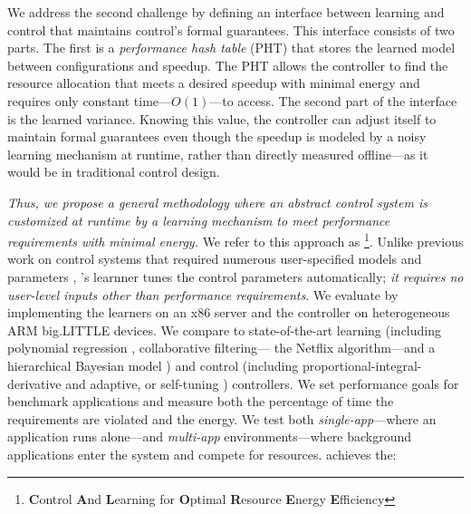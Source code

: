 We address the second challenge by defining an interface between
learning and control that maintains control's formal guarantees.  This
interface consists of two parts.  The first is a \emph{performance
  hash table} (PHT) that stores the learned model between
configurations and speedup.  The PHT allows the controller to find the
resource allocation that meets a desired speedup with minimal energy
and requires only constant time---$O(1)$---to access.  The second part
of the interface is the learned variance.  Knowing this value, the
controller can adjust itself to maintain formal guarantees even though
the speedup is modeled by a noisy learning mechanism at runtime,
rather than directly measured offline---as it would be in traditional
control design.


\emph{Thus, we propose a general methodology where an abstract control
  system is customized at runtime by a learning mechanism to meet
  performance requirements with minimal energy.} We refer to this
approach as \SYSTEM{}\footnote{\textbf{C}ontrol \textbf{A}nd
  \textbf{L}earning for \textbf{O}ptimal \textbf{R}esource
  \textbf{E}nergy \textbf{E}fficiency}.  Unlike previous work on
control systems that required numerous user-specified models and
parameters \cite{METE,Chen2011,POET,ControlWare,Agilos}, \SYSTEM{}'s
learnner tunes the control parameters automatically; \ie{} \emph{it
  requires no user-level inputs other than performance requirements}.
We evaluate \SYSTEM{} by implementing the learners on an x86 server
and the controller on heterogeneous ARM big.LITTLE devices.  We
compare to state-of-the-art learning (including polynomial regression
\cite{Koala,dubach2010}, collaborative filtering---\ie{} the Netflix
algorithm\cite{netflix,Paragon}---and a hierarchical Bayesian model
\cite{LEO}) and control (including proportional-integral-derivative
\cite{Hellerstein2004a} and adaptive, or self-tuning
\cite{HandbookControl}) controllers.  We set performance goals for
benchmark applications and measure both the percentage of time the
requirements are violated and the energy.  We test both
\emph{single-app}---where an application runs alone---and
\emph{multi-app} environments---where background applications enter
the system and compete for resources.  \SYSTEM{} achieves the:
